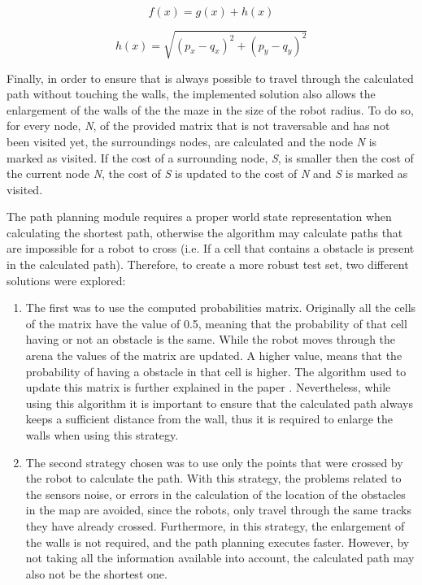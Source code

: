 \documentclass[oribibl]{llncs}
\begin{document}
\begin{equation}
f(x) = g(x) + h(x)
\end{equation}

\begin{equation}
h(x) = \sqrt{(p_x - q_x)^2 + (p_y - q_y)^2}
\end{equation}

Finally, in order to ensure that is always possible to travel through the calculated path without touching the walls, the implemented solution also allows the enlargement of the walls of the the maze in the size of the robot radius. To do so, for every node, \textit{N}, of the provided matrix that is not traversable and has not been visited yet, the surroundings nodes, are calculated and the node \textit{N} is marked as visited. If the cost of a surrounding node, \textit{S}, is smaller then the cost of the current node \textit{N}, the cost of \textit{S} is updated to the cost of \textit{N} and \textit{S} is marked as visited.

The path planning module requires a proper world state representation when calculating the shortest path, otherwise the algorithm may calculate paths that are impossible for a robot to cross (i.e. If a cell that contains a obstacle is present in the calculated path). Therefore, to create a more robust test set, two different solutions were explored:
\begin{enumerate}
\item The first was to use the computed probabilities matrix. Originally all the cells of the matrix have the value of 0.5, meaning that the probability of that cell having or not an obstacle is the same. While the robot moves through the arena the values of the matrix are updated. A higher value, means that the probability of having a obstacle in that cell is higher. The algorithm used to update this matrix is further explained in the paper \cite{baboehelder}. Nevertheless, while using this algorithm it is important to ensure that the calculated path always keeps a sufficient distance from the wall, thus it is required to enlarge the walls when using this strategy.

\item The second strategy chosen was to use only the points that were crossed by the robot to calculate the path. With this strategy, the problems related to the sensors noise, or errors in the calculation of the location of the obstacles in the map are avoided, since the robots, only travel through the same tracks they have already crossed. Furthermore, in this strategy, the enlargement of the walls is not required, and the path planning executes faster. However, by not taking all the information available into account, the calculated path may also not be the shortest one.
\end{enumerate}
\end{document}
